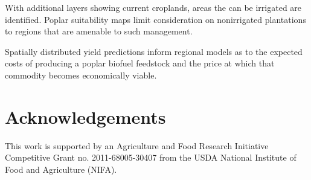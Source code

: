 \documentclass[preprint,12pt]{elsarticle}
\begin{document}
With additional layers showing current croplands, areas the can be
irrigated are identified.  Poplar suitability maps limit consideration
on nonirrigated plantations to regions that are amenable to such
management.

Spatially distributed yield predictions inform regional models as to
the expected costs of producing a poplar biofuel feedstock and the
price at which that commodity becomes economically viable.

\section{Acknowledgements}
This work is supported by an Agriculture and Food Research Initiative
Competitive Grant no. 2011-68005-30407 from the USDA National
Institute of Food and Agriculture (NIFA).



 






\end{document}
